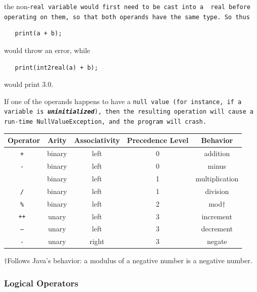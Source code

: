 \documentclass{report}
\begin{document}
\noindent the non-\tt real \rm variable would first need to be cast into a \tt
real \rm before operating on them, so that both operands have the
same type. So thus

\begin{verbatim}
   print(a + b);
\end{verbatim}

would throw an error, while

\begin{verbatim}
   print(int2real(a) + b);
\end{verbatim}

would print 3.0.

If one of the operands happens to have a \tt null \rm value (for instance, if a
variable is \textbf{\emph{uninitialized}}), then the resulting operation will
cause a run-time \tt NullValueException\rm, and the program will crash.

\begin{center}
\begin{tabular}{|c|c|c|c|c|}

\hline \textbf{Operator} & \textbf{Arity} & \textbf{Associativity} &
\textbf{Precedence Level} & \textbf{Behavior} \\ \hline
\tt + \rm & binary & left & 0 & addition \\ \hline
\tt - \rm & binary & left & 0 & minus \\ \hline
\tt * \rm & binary & left & 1 & multiplication \\ \hline
\tt / \rm & binary & left & 1 & division \\ \hline
\tt \% \rm & binary & left & 2 & mod$\dagger$
\\ 
\hline
\tt ++ \rm & unary & left & 3 & increment \\ \hline
\tt -- \rm & unary & left & 3 & decrement \\ \hline
\tt - \rm & unary & right & 3 & negate \\ \hline
\end{tabular}
\end{center}

$\dagger$Follows Java's behavior: a modulus of a negative number is a negative
number.

\subsubsection{Logical Operators} %
\label{ssub:logical_operators}
\end{document}
